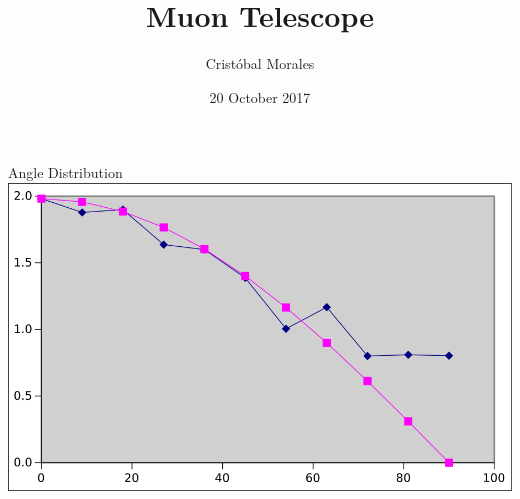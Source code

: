 \documentclass[dvipsnames]{beamer}
\title[Progress on Muon Telescope]{Muon Telescope} %
\author{Cristóbal Morales} %
\institute[PUC] %

{
\textit{cimorales2\MVAt uc.cl}\\ %
Pontificia Universidad Católica de Chile\\ %
}
\date{20 October 2017} %
\begin{document}
\begin{frame}
\titlepage %
\end{frame}


\begin{frame}{Angle Distribution}
    \includegraphics[scale=0.5]{angle_dis.svg}
\end{frame}

\end{document}

